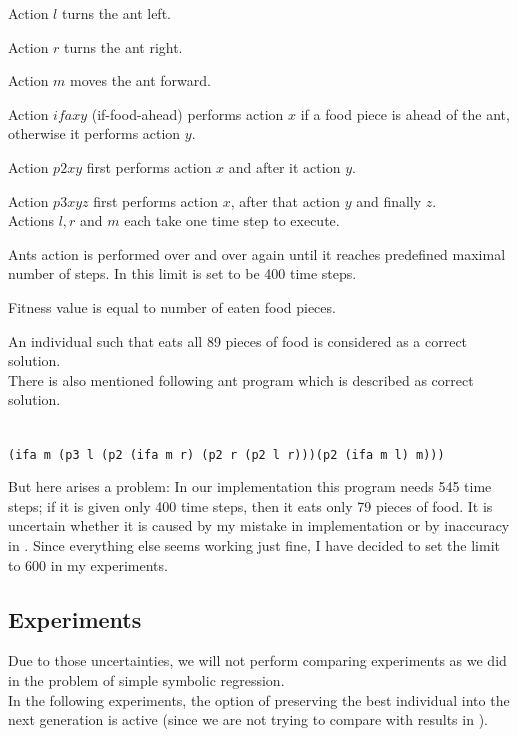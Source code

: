 \documentclass[12pt,a4paper]{report}
\begin{document}
Action $l$ turns the ant left.

Action $r$ turns the ant right.

Action $m$ moves the ant forward.

Action $ifa x y$ (if-food-ahead) performs action $x$ if a food piece is ahead of the ant,
otherwise it performs action $y$.

Action $p2 x y$ first performs action $x$ and after it action $y$.

Action $p3 x y z$ first performs action $x$, after that action $y$ and finally $z$.\\

Actions $l, r$ and $m$ each take one time step to execute.

Ants action is performed over and over again until it reaches predefined
maximal number of steps. In \cite{koza92} this limit is set to be 400 time steps.

Fitness value is equal to number of eaten food pieces.

An individual such that eats all 89 pieces of food is 
considered as a correct solution.\\

There is also mentioned following ant program which is described as correct solution.

\texttt{~\\
(ifa m (p3 l (p2 (ifa m r) (p2 r (p2 l r)))(p2 (ifa m l) m)))\\
} 

But here arises a problem: In our implementation this program needs 545
time steps; if it is given only 400 time steps, then it eats only 79 pieces
of food. It is uncertain whether it is caused by my mistake in implementation
or by inaccuracy in \cite{koza92}. Since everything else seems working just 
fine, I have decided to set the limit to 600 in my experiments.


\subsection{Experiments}


Due to those uncertainties, we will not perform comparing experiments 
as we did in the problem of simple symbolic regression.\\

In the following experiments, the option of preserving the best individual 
into the next generation is active (since we are not trying to compare 
with results in \cite{koza92}).
\end{document}
